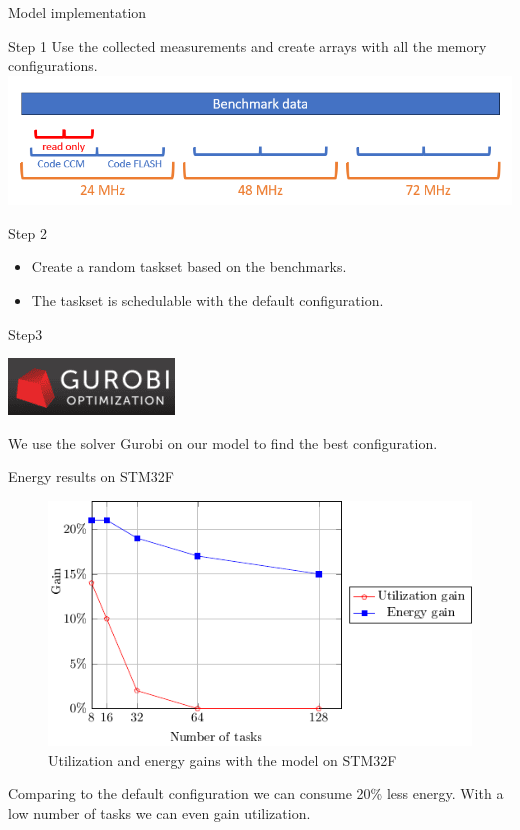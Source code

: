 \documentclass[
	11pt, %
]{beamer}
\begin{document}
\begin{frame}{Model implementation}
	\begin{block}{Step 1}
		Use the collected measurements and create arrays with all the memory configurations.\\
		\centering
		\includegraphics[scale=0.5]{images/data.png}
	\end{block}

	\begin{block}{Step 2}
		\begin{itemize}
			\item Create a random taskset based on the benchmarks.
			\item The taskset is schedulable with the default configuration.
		\end{itemize}
		
	\end{block}

	\begin{block}{Step3}
		\begin{minipage}{0.25\textwidth}
			\includegraphics[scale=0.9]{images/gurobi.png}
		\end{minipage}
		\begin{minipage}{0.6\textwidth}
			We use the solver Gurobi on our model to find the best configuration. 
		\end{minipage}
	\end{block}
\end{frame}

\begin{frame}{Energy results on STM32F}
	\begin{figure}
		\includegraphics{data/model/poster.pdf}
		\caption{Utilization and energy gains with the model on STM32F}
	\end{figure}
	Comparing to the default configuration we can consume 20\% less energy. 
	With a low number of tasks we can even gain utilization.
\end{frame}
\end{document}
